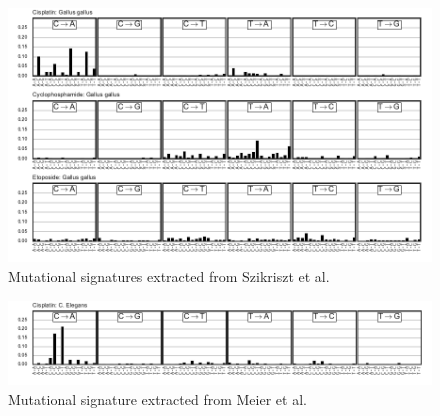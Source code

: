 \begin{figure}
\centering
\includegraphics[scale=1.0]{figures/extracted_signatures_chicken.pdf}
\caption{Mutational signatures extracted from Szikriszt et al.~\cite{Szikriszt_2016}}
\label{fig:supp_extracted_signatures_chicken}
\end{figure}

\begin{figure}
\centering
\includegraphics[scale=1.0]{figures/extracted_signatures_worm.pdf}
\caption{Mutational signature extracted from Meier et al.~\cite{Meier_2014}}
\label{fig:supp_extracted_signatures_worm}
\end{figure}

